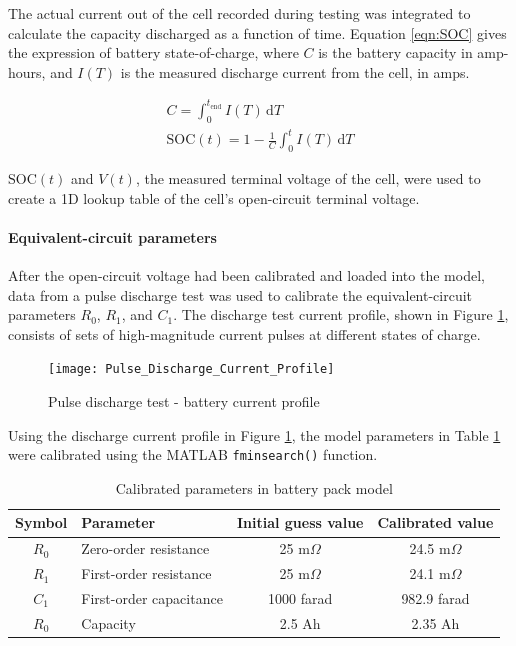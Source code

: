 \documentclass[../SimBALink.tex]{subfiles}
\begin{document}
			The actual current out of the cell recorded during testing was integrated to calculate the capacity discharged as a function of time. Equation \ref{eqn:SOC} gives the expression of battery state-of-charge, where $C$ is the battery capacity in amp-hours, and $I(T)$ is the measured discharge current from the cell, in amps.
		
			\begin{gather}
				C = \int_0^{t_\text{end}} \! I(T) \, \mathrm{d}T				\\
				\text{SOC}(t) = 1 - \frac{1}{C} \int_0^{t} \! I(T) \, \mathrm{d}T
				\label{eqn:SOC}
			\end{gather} 
		
			$\text{SOC}(t)$ and $V(t)$, the measured terminal voltage of the cell, were used to create a 1D lookup table of the cell's open-circuit terminal voltage.
			
			\FloatBarrier
			
		\paragraph{Equivalent-circuit parameters}
			After the open-circuit voltage had been calibrated and loaded into the model, data from a pulse discharge test was used to calibrate the equivalent-circuit parameters $R_0$, $R_1$, and $C_1$. The discharge test current profile, shown in Figure \ref{fig:Pulse_Discharge_Current_Profile}, consists of sets of high-magnitude current pulses at different states of charge.
			
			\begin{figure}[h!]
				\centering
				\texttt{[image: Pulse\_Discharge\_Current\_Profile]}
				\caption{Pulse discharge test - battery current profile}
				\label{fig:Pulse_Discharge_Current_Profile}
			\end{figure}
			\FloatBarrier
			
			Using the discharge current profile in Figure \ref{fig:Pulse_Discharge_Current_Profile}, the model parameters in Table \ref{table:battery_calibrated_parameters} were calibrated using the MATLAB \texttt{fminsearch()} function.
			
			\begin{table}
				\centering
				\caption{Calibrated parameters in battery pack model}
				\label{table:battery_calibrated_parameters}
				\begin{tabular}{c | l | c | c}
					Symbol		&	Parameter			&	Initial guess value	&	Calibrated value	\\
					\hline
					$R_0$		&	Zero-order resistance	&	25 m$\Omega$	&	24.5 m$\Omega$	\\
					$R_1$		&	First-order resistance	&	25 m$\Omega$	&	24.1 m$\Omega$	\\
					$C_1$		&	First-order capacitance	&	1000 farad		&	982.9 farad		\\
					$R_0$		&	Capacity				&	2.5 Ah			&	2.35 Ah
				\end{tabular}
			\end{table}
			\FloatBarrier
			
\end{document}
